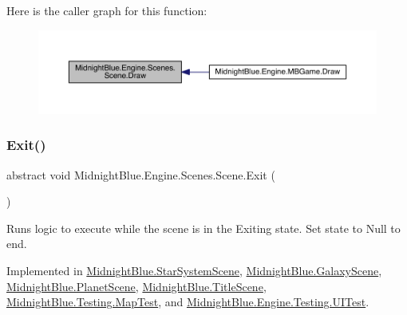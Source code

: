 Here is the caller graph for this function\+:
\nopagebreak
\begin{figure}[H]
\begin{center}
\leavevmode
\includegraphics[width=350pt]{class_midnight_blue_1_1_engine_1_1_scenes_1_1_scene_a6ec0b4be6c7dc226c9afd308e1fb3fd3_icgraph}
\end{center}
\end{figure}
\hypertarget{class_midnight_blue_1_1_engine_1_1_scenes_1_1_scene_adbf0f6d758df9fc5e20f24f327599e67}{}\label{class_midnight_blue_1_1_engine_1_1_scenes_1_1_scene_adbf0f6d758df9fc5e20f24f327599e67} 
\subsubsection{\texorpdfstring{Exit()}{Exit()}}
{\footnotesize\ttfamily abstract void Midnight\+Blue.\+Engine.\+Scenes.\+Scene.\+Exit (\begin{DoxyParamCaption}{ }\end{DoxyParamCaption})\hspace{0.3cm}{\ttfamily [pure virtual]}}



Runs logic to execute while the scene is in the Exiting state. Set state to Null to end. 



Implemented in \hyperlink{class_midnight_blue_1_1_star_system_scene_ad533ba93e597964d015099031a85cb77}{Midnight\+Blue.\+Star\+System\+Scene}, \hyperlink{class_midnight_blue_1_1_galaxy_scene_a7a96978e050da997330bcc0f3cd00f9e}{Midnight\+Blue.\+Galaxy\+Scene}, \hyperlink{class_midnight_blue_1_1_planet_scene_af3aab90a13294493e1f2cd29b0fb60e6}{Midnight\+Blue.\+Planet\+Scene}, \hyperlink{class_midnight_blue_1_1_title_scene_aed29e37e9f849cc8f8443bae057a8eb8}{Midnight\+Blue.\+Title\+Scene}, \hyperlink{class_midnight_blue_1_1_testing_1_1_map_test_a7dfcf609b9fd898f377297a0075d2159}{Midnight\+Blue.\+Testing.\+Map\+Test}, and \hyperlink{class_midnight_blue_1_1_engine_1_1_testing_1_1_u_i_test_a48b16a69a8d34b0d8d2fc30ead3c79ca}{Midnight\+Blue.\+Engine.\+Testing.\+U\+I\+Test}.

